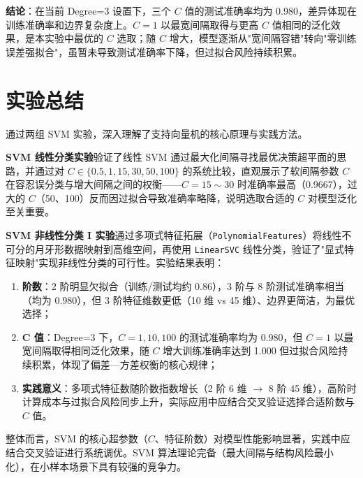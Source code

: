 \documentclass[10.5pt]{config}
\begin{document}
\textbf{结论}：在当前 Degree=3 设置下，三个 $C$ 值的测试准确率均为 0.980，差异体现在训练准确率和边界复杂度上。$C=1$ 以最宽间隔取得与更高 $C$ 值相同的泛化效果，是本实验中最优的 $C$ 选取；随 $C$ 增大，模型逐渐从"宽间隔容错"转向"零训练误差强拟合"，虽暂未导致测试准确率下降，但过拟合风险持续积累。

\clearpage
\section{实验总结}
通过两组 SVM 实验，深入理解了支持向量机的核心原理与实践方法。

\textbf{SVM 线性分类实验}验证了线性 SVM 通过最大化间隔寻找最优决策超平面的思路，并通过对 $C\in\{0.5,1,15,30,50,100\}$ 的系统比较，直观展示了软间隔参数 $C$ 在容忍误分类与增大间隔之间的权衡——$C=15\sim30$ 时准确率最高（0.9667），过大的 $C$（50、100）反而因过拟合导致准确率略降，说明选取合适的 $C$ 对模型泛化至关重要。

\textbf{SVM 非线性分类 I 实验}通过多项式特征拓展（\texttt{PolynomialFeatures}）将线性不可分的月牙形数据映射到高维空间，再使用 \texttt{LinearSVC} 线性分类，验证了"显式特征映射"实现非线性分类的可行性。实验结果表明：
\begin{enumerate}
    \item \textbf{阶数}：2 阶明显欠拟合（训练/测试均约 0.86），3 阶与 8 阶测试准确率相当（均为 0.980），但 3 阶特征维数更低（10 维 vs 45 维）、边界更简洁，为最优选择；
    \item \textbf{C 值}：Degree=3 下，$C=1,10,100$ 的测试准确率均为 0.980，但 $C=1$ 以最宽间隔取得相同泛化效果，随 $C$ 增大训练准确率达到 1.000 但过拟合风险持续积累，体现了偏差—方差权衡的核心规律；
    \item \textbf{实践意义}：多项式特征数随阶数指数增长（2 阶 6 维 $\to$ 8 阶 45 维），高阶时计算成本与过拟合风险同步上升，实际应用中应结合交叉验证选择合适阶数与 $C$ 值。
\end{enumerate}

整体而言，SVM 的核心超参数（$C$、特征阶数）对模型性能影响显著，实践中应结合交叉验证进行系统调优。SVM 算法理论完备（最大间隔与结构风险最小化），在小样本场景下具有较强的竞争力。
\end{document}

